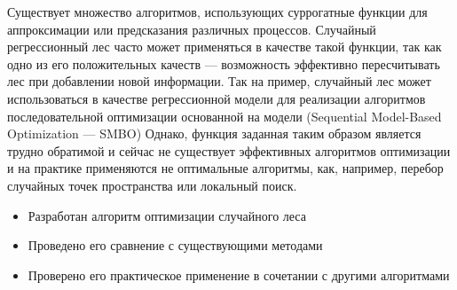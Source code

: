 \documentclass[pscyr,specification,annotation]{itmo-student-thesis}
\begin{document}





\tableofcontents

\startprefacepage

Существует множество алгоритмов, использующих суррогатные функции для
аппроксимации или предсказания различных процессов. Случайный регрессионный лес
часто может применяться в качестве такой функции, так как одно из его
положительных качеств --- возможность эффективно пересчитывать лес при
добавлении новой информации. Так на пример, случайный лес может использоваться
в качестве регрессионной модели для реализации алгоритмов последовательной
оптимизации основанной на модели (Sequential Model-Based Optimization ---
SMBO\cite{bro}) Однако, функция заданная таким образом является трудно обратимой
и сейчас не существует эффективных алгоритмов оптимизации и на практике
применяются не оптимальные алгоритмы, как, например, перебор случайных точек
пространства или локальный поиск.






\startconclusionpage{}
    \begin{itemize}
        \item Разработан алгоритм оптимизации случайного леса
        \item Проведено его сравнение с существующими методами
        \item Проверено его практическое применение в сочетании с другими алгоритмами
    \end{itemize}

\printmainbibliography%
\end{document}
